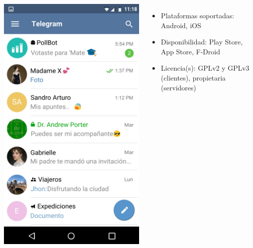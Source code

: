 \begin{frame}
\begin{columns}[c]
\begin{center}
                \includegraphics[height=0.5\textheight]{images/telegram-screencap.png}
            \end{center}
            \begin{itemize}
                \item Plataformas soportadas: Android, iOS
                \item Disponibilidad: Play Store, App Store, F-Droid
                \item Licencia(s): GPLv2 y GPLv3 (clientes), propietaria (servidores)
            \end{itemize}
    \end{columns}

\end{frame}

